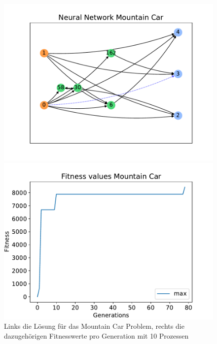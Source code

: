 \begin{figure}[!h]
	\centering
	\begin{minipage}[]{0.49\textwidth}
		\includegraphics[width=1.0\textwidth]{./img/mountain_car_single/mountain_car_neural_network.pdf} 
	\end{minipage}
	\hfill
	\begin{minipage}[]{0.49\textwidth}
		\includegraphics[width=1.0\textwidth]{./img/mountain_car_single/1413_fitness_1core_1pi.pdf} 
	\end{minipage}
	\caption{Links die Lösung für das Mountain Car Problem, rechts die dazugehörigen Fitnesswerte pro Generation mit 10 Prozessen}
	\label{fig:mountain_car_10core_neural_network_and_fitness}
\end{figure}
